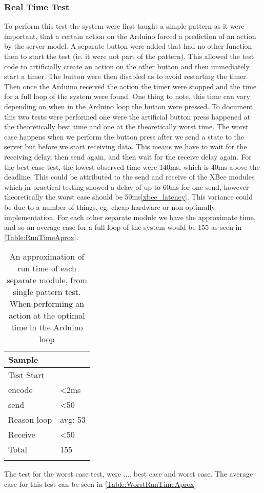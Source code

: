 \subsubsection{Real Time Test}
To perform this test the system were first taught a simple pattern as it were important, that a certain action on the Arduino forced a prediction of an action by the server model. A separate button were added that had no other function then to start the test (ie. it were not part of the pattern). This allowed the test code to artificially create an action on the other button and then immediately start a timer. The button were then disabled as to avoid restarting the timer. Then once the Arduino received the action the timer were stopped and the time for a full loop of the system were found. One thing to note, this time can vary depending on when in the Arduino loop the button were pressed. To document this two tests were performed one were the artificial button press happened at the theoretically best time and one at the theoretically worst time. The worst case happens when we perform the button press after we send a state to the server but before we start receiving data. This means we have to wait for the receiving delay, then send again, and then wait for the receive delay again. For the best case test, the lowest observed time were 140ms, which is 40ms above the deadline. This could be attributed to the send and receive of the XBee modules which in practical testing showed a delay of up to 60ms for one send, however theoretically the worst case should be 50ms\cref{xbee_latency}. This variance could be due to a number of things, eg. cheap hardware or non-optimally implementation. For each other separate module we have the approximate time, and so an average case for a full loop of the system would be 155 as seen in \cref{Table:RunTimeAprox}.
\begin{center}
	\begin{table}[htbp]
	  \centering
	  \begin{tabular}{l | l}
		\toprule
		Sample  		& 			\\ \midrule
		Test Start		&     \\
		encode 			& <2ms  	\\
		send   			& <50  		\\
		Reason loop 	& avg: 53 	\\
		Receive 		& <50  		\\
		Total			& 155		\\
									\\ \bottomrule
	  \end{tabular}
	  \caption{An approximation of run time of each separate module, from single pattern test. When performing an action at the optimal time in the Arduino loop}
	\end{table}
 \label{Table:RunTimeAprox}
\end{center}
The test for the worst case test, were .... best case and worst case.
The average case for this test can be seen in \cref{Table:WorstRunTimeAprox}

